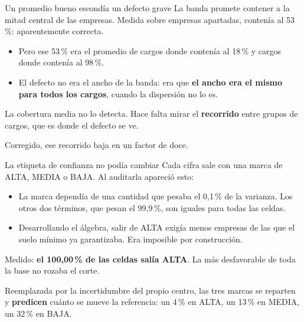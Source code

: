 \documentclass[11pt]{beamer}
\begin{document}
\begin{frame}{Un promedio bueno escondía un defecto grave}
La banda promete contener a la mitad central de las empresas. Medida sobre
empresas apartadas, contenía al \alert{53\,\%}: aparentemente correcta.
\vspace{0.8em}
\begin{itemize}
\item Pero ese 53\,\% era el promedio de cargos donde contenía al \alert{18\,\%}
y cargos donde contenía al \alert{98\,\%}.
\item El defecto no era el ancho de la banda: era que \textbf{el ancho era el
mismo para todos los cargos}, cuando la dispersión no lo es.
\end{itemize}
\vspace{0.8em}
La cobertura media no lo detecta. Hace falta mirar el \textbf{recorrido} entre
grupos de cargos, que es donde el defecto se ve.
\vspace{0.5em}

Corregido, ese recorrido baja en un factor de doce.
\end{frame}

\begin{frame}{La etiqueta de confianza no podía cambiar}
Cada cifra sale con una marca de ALTA, MEDIA o BAJA. Al auditarla apareció esto:
\vspace{0.8em}
\begin{itemize}
\item La marca dependía de una cantidad que pesaba el \alert{0,1\,\%} de la
varianza. Los otros dos términos, que pesan el 99,9\,\%, son iguales para todas
las celdas.
\item Desarrollando el álgebra, salir de ALTA exigía menos empresas de las que
el suelo mínimo ya garantizaba. Era \alert{imposible por construcción}.
\end{itemize}
\vspace{0.8em}
Medido: \textbf{el 100,00\,\% de las celdas salía ALTA}. La más desfavorable de
toda la base no rozaba el corte.
\vspace{0.6em}

Reemplazada por la incertidumbre del propio centro, las tres marcas se reparten
y \textbf{predicen} cuánto se mueve la referencia: un 4\,\% en ALTA, un 13\,\%
en MEDIA, un 32\,\% en BAJA.
\end{frame}
\end{document}
